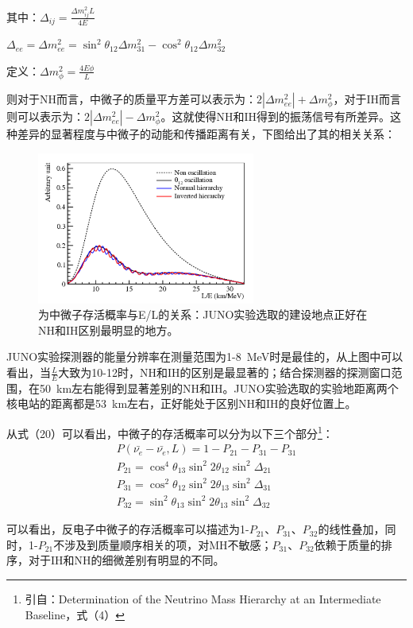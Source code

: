 \documentclass[10pt,a4paper]{article}
\begin{document}
其中：$\Delta_{ij}=\frac{\Delta{m_{ij}^2}L}{4E}$

$\Delta_{ee}=\Delta{m_{ee}^2}=\sin^2{\theta_{12}}\Delta{m_{31}^2}-\cos^2{\theta_{12}}\Delta{m_{32}^2}$

定义：$\Delta{m_{\phi}^2}=\frac{4E\phi}{L}$

则对于NH而言，中微子的质量平方差可以表示为：$2|\Delta{m_{ee}^2}|+\Delta{m_{\phi}^2}$，对于IH而言则可以表示为：$2|\Delta{m_{ee}^2}|-\Delta{m_{\phi}^2}$。这就使得NH和IH得到的振荡信号有所差异。这种差异的显著程度与中微子的动能和传播距离有关，下图给出了其的相关关系：
\begin{figure}[ht]
 \centering
 \includegraphics[height=5cm]{images/L-selet.png}
 \caption{为中微子存活概率与E/L的关系：JUNO实验选取的建设地点正好在NH和IH区别最明显的地方。}
 \label{fig:singleblock}
\end{figure}

JUNO实验探测器的能量分辨率在测量范围为1-\SI{8}{MeV}时是最佳的，从上图中可以看出，当$\frac{L}{E}$大致为10-12时，NH和IH的区别是最显著的；结合探测器的探测窗口范围，在\SI{50}{km}左右能得到显著差别的NH和IH。JUNO实验选取的实验地距离两个核电站的距离都是\SI{53}{km}左右，正好能处于区别NH和IH的良好位置上。

从式（20）可以看出，中微子的存活概率可以分为以下三个部分\footnote{引自：Determination of the Neutrino Mass Hierarchy at an Intermediate Baseline，式（4）}：
 \begin{equation}
 \begin{split}
P(\bar{\nu_e}-\bar{\nu_e},L)=1-P_{21}-P_{31}-P_{31}\\
P_{21}=\cos^4{\theta_{13}}\sin^2{2\theta_{12}}\sin^2{\Delta_{21}}\\
P_{31}=\cos^2{\theta_{12}}\sin^2{2\theta_{13}}\sin^2{\Delta_{31}}\\
P_{32}=\sin^2\theta_{13}\sin^2{2\theta_{13}}\sin^2{\Delta_{32}} 
 \end{split}
 \end{equation}

可以看出，反电子中微子的存活概率可以描述为1-$P_{21}$、$P_{31}$、$P_{32}$的线性叠加，同时，1-$P_{21}$不涉及到质量顺序相关的项，对MH不敏感；$P_{31}$、$P_{32}$依赖于质量的排序，对于IH和NH的细微差别有明显的不同。
\end{document}

